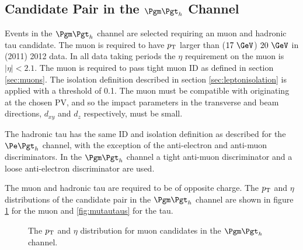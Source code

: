 \subsection{Candidate Pair in the $\mutau$ Channel}

Events in the $\mutau$ channel are selected requiring an muon and hadronic tau
candidate. The muon is required to have $p_{\mathrm{T}}$ larger than ($17~\GeV$)
$20~\GeV$ in (2011) 2012 data. In all data taking periods the $\eta$ requirement
on the muon is $|\eta| < 2.1$. The muon is required to pass tight muon ID as
defined in section \ref{sec:muons}. The isolation definition described in 
section \ref{sec:leptonisolation} is
applied with a threshold of 0.1. The muon must be compatible with
originating at the chosen \ac{PV}, and so the impact parameters in the
transverse and beam directions, $d_{xy}$ and $d_{z}$ respectively, must be
small. 

The hadronic tau has the same ID and isolation definition as described for the $\etau$
channel, with the exception of the anti-electron and anti-muon discriminators.
In the $\mutau$ channel a tight anti-muon discriminator and a loose
anti-electron discriminator are used. 

The muon and hadronic tau are required to be of opposite charge. 
The $p_{\mathrm{T}}$ and $\eta$ distributions of the candidate pair in the
$\mutau$ channel are shown in figure \ref{fig:mutaumuons} for the muon and
\ref{fig:mutautaus} for the tau. 


\begin{figure}[htb]
\begin{center}

\end{center}
\caption{
The $p_{\mathrm{T}}$ and $\eta$ distribution for muon candidates in the $\mutau$
channel.
}
\label{fig:mutaumuons}
\end{figure}


